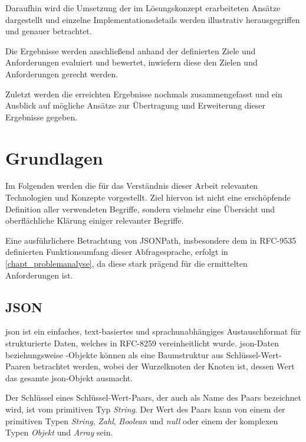 \documentclass[oneside]{ausarbeitung}
\begin{document}
Daraufhin wird die Umsetzung der im Lösungskonzept erarbeiteten Ansätze dargestellt und einzelne Implementationsdetails werden illustrativ herausgegriffen und genauer betrachtet.
	
Die Ergebnisse werden anschließend anhand der definierten Ziele und Anforderungen evaluiert und bewertet, inwiefern diese den Zielen und Anforderungen gerecht werden.
	
Zuletzt werden die erreichten Ergebnisse nochmals zusammengefasst und ein Ausblick auf mögliche Ansätze zur Übertragung und Erweiterung dieser Ergebnisse gegeben.










\chapter{Grundlagen}
\label{cha:grundlagen}

Im Folgenden werden die für das Verständnis dieser Arbeit relevanten Technologien und Konzepte vorgestellt. Ziel hiervon ist nicht eine erschöpfende Definition aller verwendeten Begriffe, sondern vielmehr eine Übersicht und oberflächliche Klärung einiger relevanter Begriffe.
	
Eine ausführlichere Betrachtung von JSONPath, insbesondere dem in RFC-9535 definierten Funktionsumfang dieser Abfragesprache, erfolgt in \ref{chapt_problemanalyse}, da diese stark prägend für die ermittelten Anforderungen ist.

\section{JSON}
	
\ac{json} ist ein einfaches, text-basiertes und sprachunabhängiges Austauschformat für strukturierte Daten, welches in RFC-8259 vereinheitlicht wurde. \ac{json}-Daten beziehungsweise -Objekte können als eine Baumstruktur aus Schlüssel-Wert-Paaren betrachtet werden, wobei der Wurzelknoten der Knoten ist, dessen Wert das gesamte \ac{json}-Objekt ausmacht.
	
Der Schlüssel eines Schlüssel-Wert-Paars, der auch als Name des Paars bezeichnet wird, ist vom primitiven Typ \textit{String}. Der Wert des Paars kann von einem der primitiven Typen \textit{String}, \textit{Zahl}, \textit{Boolean} und \textit{null} oder einem der komplexen Typen \textit{Objekt} und \textit{Array} sein.
	
\end{document}
